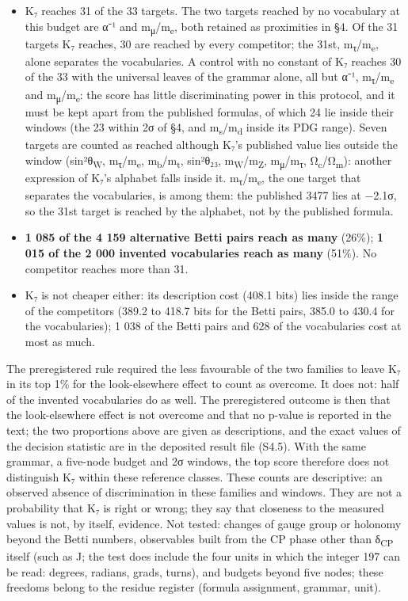 \documentclass[11pt,a4paper]{article}
\begin{document}
\begin{itemize}
\tightlist
\item
  K₇ reaches 31 of the 33 targets. The two targets reached by no vocabulary at this budget are α⁻¹ and m\textsubscript{μ}/m\textsubscript{e}, both retained as proximities in §4. Of the 31 targets K₇ reaches, 30 are reached by every competitor; the 31st, m\textsubscript{τ}/m\textsubscript{e}, alone separates the vocabularies. A control with no constant of K₇ reaches 30 of the 33 with the universal leaves of the grammar alone, all but α⁻¹, m\textsubscript{τ}/m\textsubscript{e} and m\textsubscript{μ}/m\textsubscript{e}: the score has little discriminating power in this protocol, and it must be kept apart from the published formulas, of which 24 lie inside their windows (the 23 within 2σ of §4, and m\textsubscript{s}/m\textsubscript{d} inside its PDG range). Seven targets are counted as reached although K₇'s published value lies outside the window (sin²θ\textsubscript{W}, m\textsubscript{τ}/m\textsubscript{e}, m\textsubscript{b}/m\textsubscript{t}, sin²θ₂₃, m\textsubscript{W}/m\textsubscript{Z}, m\textsubscript{μ}/m\textsubscript{τ}, Ω\textsubscript{c}/Ω\textsubscript{m}): another expression of K₇'s alphabet falls inside it. m\textsubscript{τ}/m\textsubscript{e}, the one target that separates the vocabularies, is among them: the published 3477 lies at −2.1σ, so the 31st target is reached by the alphabet, not by the published formula.
\item
  \textbf{1 085 of the 4 159 alternative Betti pairs reach as many} (26\%); \textbf{1 015 of the 2 000 invented vocabularies reach as many} (51\%). No competitor reaches more than 31.
\item
  K₇ is not cheaper either: its description cost (408.1 bits) lies inside the range of the competitors (389.2 to 418.7 bits for the Betti pairs, 385.0 to 430.4 for the vocabularies); 1 038 of the Betti pairs and 628 of the vocabularies cost at most as much.
\end{itemize}

The preregistered rule required the less favourable of the two families to leave K₇ in its top 1\% for the look-elsewhere effect to count as overcome. It does not: half of the invented vocabularies do as well. The preregistered outcome is then that the look-elsewhere effect is not overcome and that no p-value is reported in the text; the two proportions above are given as descriptions, and the exact values of the decision statistic are in the deposited result file (S4.5). With the same grammar, a five-node budget and 2σ windows, the top score therefore does not distinguish K₇ within these reference classes. These counts are descriptive: an observed absence of discrimination in these families and windows. They are not a probability that K₇ is right or wrong; they say that closeness to the measured values is not, by itself, evidence. Not tested: changes of gauge group or holonomy beyond the Betti numbers, observables built from the CP phase other than δ\textsubscript{CP} itself (such as J; the test does include the four units in which the integer 197 can be read: degrees, radians, grads, turns), and budgets beyond five nodes; these freedoms belong to the residue register (formula assignment, grammar, unit).
\end{document}
